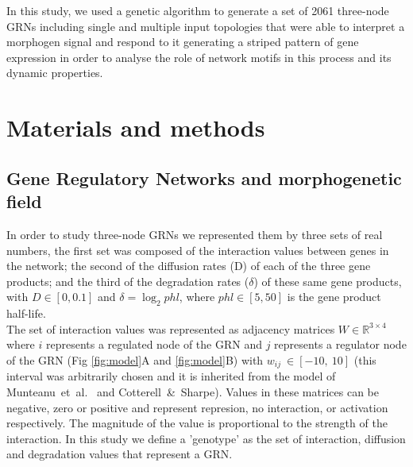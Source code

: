 \documentclass[10pt,letterpaper]{article}
\begin{document}
In this study, we used a genetic algorithm to generate a set of 2061 three-node GRNs
including single and multiple input topologies that were able to interpret a morphogen
signal and respond to it generating a striped pattern of gene expression in order to
analyse the role of network motifs in this process and its dynamic properties.



\section*{Materials and methods}
\subsection*{Gene Regulatory Networks and morphogenetic field}

In order to study three-node GRNs we represented them by three sets of real
numbers, the first set was composed of the interaction values
between genes in the network; the second of the diffusion rates (D) of each of
the three gene products; and the third of the degradation rates ($\delta$) of
these same gene products, with $D \in [0, 0.1]$ and $\delta = \log_{2}phl$, where
$phl \in [5, 50]$ is the gene product half-life.\\

The set of interaction values was represented as adjacency matrices $W \in
\mathbb{R}^{3\times4}$ where $i$ represents a regulated node of the GRN and $j$
represents a regulator node of the GRN (Fig \ref{fig:model}A and
\ref{fig:model}B) with $w_{\textit{ij}}~\in [-10,\ 10]$ (this interval was arbitrarily
chosen and it is inherited from the model of Munteanu~et~al.~\cite{munteanu_2014}
and Cotterell~\&~Sharpe\cite{Cotterell2010}). Values in these
matrices can be negative, zero or positive and represent represion, no
interaction, or activation respectively. The magnitude of the value is
proportional to the strength of the interaction. In this study we define
a 'genotype' as the set of interaction, diffusion and degradation values that
represent a GRN.\\
\end{document}
